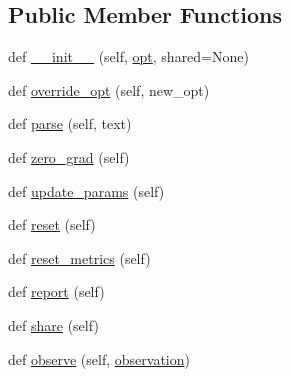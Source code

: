 \subsection*{Public Member Functions}
\begin{DoxyCompactItemize}
\item 
def \hyperlink{classparlai_1_1agents_1_1language__model_1_1language__model_1_1LanguageModelAgent_ae2277cc7020d5aeae4b53e195842c379}{\+\_\+\+\_\+init\+\_\+\+\_\+} (self, \hyperlink{classparlai_1_1agents_1_1language__model_1_1language__model_1_1LanguageModelAgent_af8d8114af65bf817afe01545033d51e6}{opt}, shared=None)
\item 
def \hyperlink{classparlai_1_1agents_1_1language__model_1_1language__model_1_1LanguageModelAgent_acd53015e95f8aead134d65e2cc8cf180}{override\+\_\+opt} (self, new\+\_\+opt)
\item 
def \hyperlink{classparlai_1_1agents_1_1language__model_1_1language__model_1_1LanguageModelAgent_ad67bbe760648032c08da9400bb2e3da1}{parse} (self, text)
\item 
def \hyperlink{classparlai_1_1agents_1_1language__model_1_1language__model_1_1LanguageModelAgent_ad7b6363acdfb3d009cd9a3bcc6206faf}{zero\+\_\+grad} (self)
\item 
def \hyperlink{classparlai_1_1agents_1_1language__model_1_1language__model_1_1LanguageModelAgent_af474c46339e2e0c881f8b8b81f5f9b7f}{update\+\_\+params} (self)
\item 
def \hyperlink{classparlai_1_1agents_1_1language__model_1_1language__model_1_1LanguageModelAgent_ae4ccc140cc9d528c4135ec65f2bb4325}{reset} (self)
\item 
def \hyperlink{classparlai_1_1agents_1_1language__model_1_1language__model_1_1LanguageModelAgent_a62896fd9aa38b55c6ea1b8a8770e3261}{reset\+\_\+metrics} (self)
\item 
def \hyperlink{classparlai_1_1agents_1_1language__model_1_1language__model_1_1LanguageModelAgent_acc05a1253c9fc32f8d1f9817b9ca559e}{report} (self)
\item 
def \hyperlink{classparlai_1_1agents_1_1language__model_1_1language__model_1_1LanguageModelAgent_a9d871fa6c5da46d2fd5564b814001a97}{share} (self)
\item 
def \hyperlink{classparlai_1_1agents_1_1language__model_1_1language__model_1_1LanguageModelAgent_a78df1c525c94c4cc68e05cd44ee374fd}{observe} (self, \hyperlink{classparlai_1_1agents_1_1language__model_1_1language__model_1_1LanguageModelAgent_aee73b46f6a1dd58cf369bf39b6c66903}{observation})
\item 

\end{DoxyCompactItemize}
